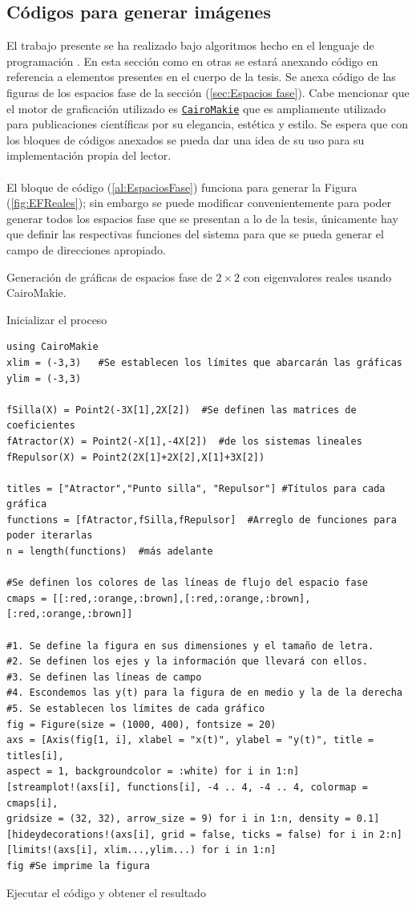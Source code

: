 \subsection{Códigos para generar imágenes}
El trabajo presente se ha realizado bajo algoritmos hecho en el lenguaje de programación \julia. En esta sección como en otras se estará anexando código en referencia a elementos presentes en el cuerpo de la tesis. Se anexa código de las figuras de los espacios fase de la sección (\ref{sec:Espacios fase}). Cabe mencionar que el motor de graficación utilizado es \href{https://github.com/JuliaPlots/CairoMakie.jl}{\texttt{CairoMakie}} que es ampliamente utilizado para publicaciones científicas por su elegancia, estética y estilo. Se espera que con los bloques de códigos anexados se pueda dar una idea de su uso para su implementación propia del lector.\\
\\
El bloque de código (\ref{al:EspaciosFase}) funciona para generar la Figura (\ref{fig:EFReales}); sin embargo se puede modificar convenientemente para poder generar todos los espacios fase que se presentan a lo de la tesis, únicamente hay que definir las respectivas funciones del sistema para que se pueda generar el campo de direcciones apropiado.
\begin{algorithm}
	\caption{Generación de gráficas de espacios fase de $2\times 2$ con eigenvalores reales usando CairoMakie.}
	\label{al:EspaciosFase}
	Inicializar el proceso\;	
	\begin{verbatim}
using CairoMakie
xlim = (-3,3)	#Se establecen los límites que abarcarán las gráficas
ylim = (-3,3)

fSilla(X) = Point2(-3X[1],2X[2])  #Se definen las matrices de coeficientes
fAtractor(X) = Point2(-X[1],-4X[2])  #de los sistemas lineales
fRepulsor(X) = Point2(2X[1]+2X[2],X[1]+3X[2])

titles = ["Atractor","Punto silla", "Repulsor"] #Títulos para cada gráfica
functions = [fAtractor,fSilla,fRepulsor]  #Arreglo de funciones para poder iterarlas
n = length(functions)  #más adelante

#Se definen los colores de las líneas de flujo del espacio fase
cmaps = [[:red,:orange,:brown],[:red,:orange,:brown],[:red,:orange,:brown]]

#1. Se define la figura en sus dimensiones y el tamaño de letra.
#2. Se definen los ejes y la información que llevará con ellos. 
#3. Se definen las líneas de campo
#4. Escondemos las y(t) para la figura de en medio y la de la derecha
#5. Se establecen los límites de cada gráfico
fig = Figure(size = (1000, 400), fontsize = 20)
axs = [Axis(fig[1, i], xlabel = "x(t)", ylabel = "y(t)", title = titles[i],
aspect = 1, backgroundcolor = :white) for i in 1:n]
[streamplot!(axs[i], functions[i], -4 .. 4, -4 .. 4, colormap = cmaps[i],
gridsize = (32, 32), arrow_size = 9) for i in 1:n, density = 0.1]
[hideydecorations!(axs[i], grid = false, ticks = false) for i in 2:n]
[limits!(axs[i], xlim...,ylim...) for i in 1:n]
fig	#Se imprime la figura
	\end{verbatim}
	 Ejecutar el código y obtener el resultado\;
\end{algorithm}

